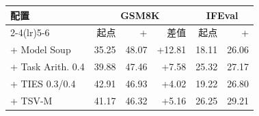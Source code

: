 \begin{tabular}{@{}lrrrrr@{}}
\toprule
\method{} 配置 & \multicolumn{3}{c}{GSM8K} & \multicolumn{2}{c}{IFEval} \\
\cmidrule(lr){2-4}\cmidrule(lr){5-6}
 & 起点 & + \method{} & 差值 & 起点 & + \method{} \\
\midrule
\method{} + Model Soup & 35.25 & 48.07 & +12.81 & 18.11 & 26.06 \\
\method{} + Task Arith. 0.4 & 39.88 & 47.46 & +7.58 & 25.32 & 27.17 \\
\method{} + TIES 0.3/0.4 & 42.91 & 46.93 & +4.02 & 19.22 & 26.80 \\
\method{} + TSV-M & 41.17 & 46.32 & +5.16 & 26.25 & 29.21 \\
\bottomrule
\end{tabular}
